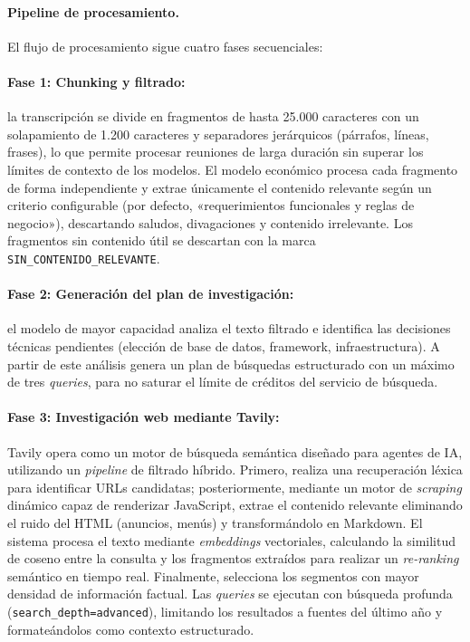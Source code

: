 \documentclass[11pt, letterpaper]{article}
\begin{document}
\paragraph{Pipeline de procesamiento.}
El flujo de procesamiento sigue cuatro fases secuenciales:

\paragraph{Fase 1: Chunking y filtrado:} la transcripción se divide en fragmentos de hasta 25.000 caracteres con un solapamiento de 1.200 caracteres y separadores jerárquicos (párrafos, líneas, frases), lo que permite procesar reuniones de larga duración sin superar los límites de contexto de los modelos. El modelo económico procesa cada fragmento de forma independiente y extrae únicamente el contenido relevante según un criterio configurable (por defecto, «requerimientos funcionales y reglas de negocio»), descartando saludos, divagaciones y contenido irrelevante. Los fragmentos sin contenido útil se descartan con la marca \texttt{SIN\_CONTENIDO\_RELEVANTE}.
    
\paragraph{Fase 2: Generación del plan de investigación:} el modelo de mayor capacidad analiza el texto filtrado e identifica las decisiones técnicas pendientes (elección de base de datos, framework, infraestructura). A partir de este análisis genera un plan de búsquedas estructurado con un máximo de tres \textit{queries}, para no saturar el límite de créditos del servicio de búsqueda.
    
\paragraph{Fase 3: Investigación web mediante Tavily:} Tavily opera como un motor de búsqueda semántica diseñado para agentes de IA, utilizando un \textit{pipeline} de filtrado híbrido. Primero, realiza una recuperación léxica para identificar URLs candidatas; posteriormente, mediante un motor de \textit{scraping} dinámico capaz de renderizar JavaScript, extrae el contenido relevante eliminando el ruido del HTML (anuncios, menús) y transformándolo en Markdown. El sistema procesa el texto mediante \textit{embeddings} vectoriales, calculando la similitud de coseno entre la consulta y los fragmentos extraídos para realizar un \textit{re-ranking} semántico en tiempo real. Finalmente, selecciona los segmentos con mayor densidad de información factual. Las \textit{queries} se ejecutan con búsqueda profunda (\texttt{search\_depth=advanced}), limitando los resultados a fuentes del último año y formateándolos como contexto estructurado.
    
\end{document}
